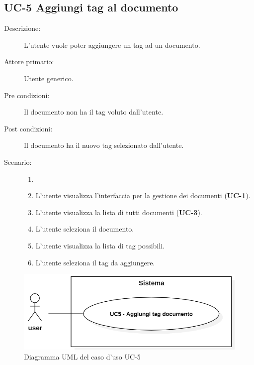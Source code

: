 \subsection{UC-5 Aggiungi tag al documento}
\begin{description}
    \item[Descrizione:] L’utente vuole poter aggiungere un tag ad un documento.
    \item[Attore primario:] Utente generico.
    \item[Pre condizioni:] Il documento non ha il tag voluto dall’utente.
    \item[Post condizioni:] Il documento ha il nuovo tag selezionato dall’utente.
    \item[Scenario:]
    \begin{enumerate}
        \item[] 
        \item L’utente visualizza l'interfaccia per la gestione dei documenti (\textbf{UC-1}).
        \item L’utente visualizza la lista di tutti documenti (\textbf{UC-3}).
        \item L'utente seleziona il documento.
        \item L’utente visualizza la lista di tag possibili.
        \item L’utente seleziona il tag da aggiungere.
    \end{enumerate}
\end{description}

\begin{figure}[H]
    \centering
    \includegraphics[width=0.8\linewidth]{UC5.PNG}
    \caption{Diagramma UML del caso d'uso UC-5}
    \label{fig:UC5}
\end{figure}

